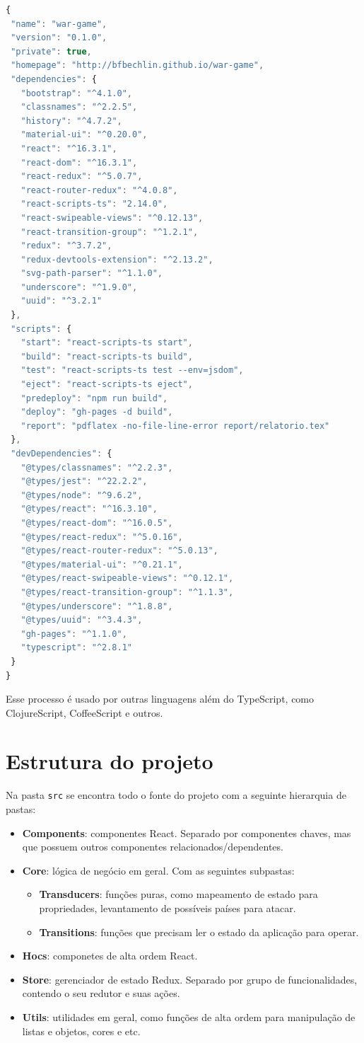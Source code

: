 \documentclass[rel_mlp]{iiufrgs}
\begin{document}
\begin{lstlisting}[language=JavaScript]
{
 "name": "war-game",
 "version": "0.1.0",
 "private": true,
 "homepage": "http://bfbechlin.github.io/war-game",
 "dependencies": {
   "bootstrap": "^4.1.0",
   "classnames": "^2.2.5",
   "history": "^4.7.2",
   "material-ui": "^0.20.0",
   "react": "^16.3.1",
   "react-dom": "^16.3.1",
   "react-redux": "^5.0.7",
   "react-router-redux": "^4.0.8",
   "react-scripts-ts": "2.14.0",
   "react-swipeable-views": "^0.12.13",
   "react-transition-group": "^1.2.1",
   "redux": "^3.7.2",
   "redux-devtools-extension": "^2.13.2",
   "svg-path-parser": "^1.1.0",
   "underscore": "^1.9.0",
   "uuid": "^3.2.1"
 },
 "scripts": {
   "start": "react-scripts-ts start",
   "build": "react-scripts-ts build",
   "test": "react-scripts-ts test --env=jsdom",
   "eject": "react-scripts-ts eject",
   "predeploy": "npm run build",
   "deploy": "gh-pages -d build",
   "report": "pdflatex -no-file-line-error report/relatorio.tex"
 },
 "devDependencies": {
   "@types/classnames": "^2.2.3",
   "@types/jest": "^22.2.2",
   "@types/node": "^9.6.2",
   "@types/react": "^16.3.10",
   "@types/react-dom": "^16.0.5",
   "@types/react-redux": "^5.0.16",
   "@types/react-router-redux": "^5.0.13",
   "@types/material-ui": "^0.21.1",
   "@types/react-swipeable-views": "^0.12.1",
   "@types/react-transition-group": "^1.1.3",
   "@types/underscore": "^1.8.8",
   "@types/uuid": "^3.4.3",
   "gh-pages": "^1.1.0",
   "typescript": "^2.8.1"
 }
}
\end{lstlisting}

Esse processo é usado por outras linguagens além do TypeScript, como ClojureScript, CoffeeScript e outros.

\section{Estrutura do projeto}
Na pasta \verb|src| se encontra todo o fonte do projeto com a seguinte hierarquia de pastas:
\begin{itemize}
  \item \textbf{Components}: componentes React. Separado por componentes chaves, mas que possuem outros componentes relacionados/dependentes.
  \item \textbf{Core}: lógica de negócio em geral. Com as seguintes subpastas:
    \begin{itemize}
      \item \textbf{Transducers}: funções puras, como mapeamento de estado para propriedades, levantamento de possíveis países para atacar.
      \item \textbf{Transitions}: funções que precisam ler o estado da aplicação para operar.
    \end{itemize}
  \item \textbf{Hocs}: componetes de alta ordem React.
  \item \textbf{Store}: gerenciador de estado Redux. Separado por grupo de funcionalidades, contendo o seu redutor e suas ações.
  \item \textbf{Utils}: utilidades em geral, como funções de alta ordem para manipulação de listas e objetos, cores e etc.
\end{itemize}
\end{document}
